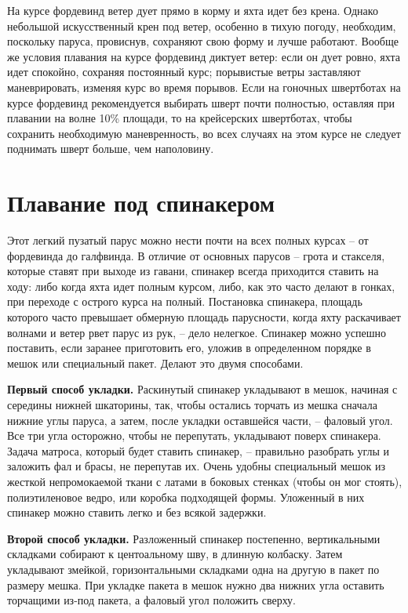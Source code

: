 \documentclass[a4paper, 12pt, twoside, final]{scrbook}
\begin{document}
На курсе фордевинд ветер дует прямо в корму и яхта идет без крена. Однако небольшой искусственный крен под ветер, особенно в тихую погоду, необходим, поскольку паруса, провиснув, сохраняют свою форму и лучше работают. Вообще же условия плавания на курсе фордевинд диктует ветер: если он дует ровно, яхта идет спокойно, сохраняя постоянный курс; порывистые ветры заставляют маневрировать, изменяя курс во время порывов.
Если на гоночных швертботах на курсе фордевинд рекомендуется выбирать шверт почти полностью, оставляя при плавании на волне 10\% площади, то на крейсерских швертботах, чтобы сохранить необходимую маневренность, во всех случаях на этом курсе не следует поднимать шверт больше, чем наполовину.

\section{Плавание под спинакером}

Этот легкий пузатый парус можно нести почти на всех полных курсах \--- от фордевинда до галфвинда. В отличие от основных парусов \--- грота и стакселя, которые ставят при выходе из гавани, спинакер всегда приходится ставить на ходу: либо когда яхта идет полным курсом, либо, как это часто делают в гонках, при переходе с острого курса на полный. Постановка спинакера, площадь которого часто превышает обмерную площадь парусности, когда яхту раскачивает волнами и ветер рвет парус из рук, \--- дело нелегкое. Спинакер можно успешно поставить, если заранее приготовить его, уложив в определенном порядке в мешок или специальный пакет. Делают это двумя способами.

\textbf{Первый способ укладки.} Раскинутый спинакер укладывают в мешок, начиная с середины нижней шкаторины, так, чтобы остались торчать из мешка сначала нижние углы паруса, а затем, после укладки оставшейся части, \--- фаловый угол. Все три угла осторожно, чтобы не перепутать, укладывают поверх спинакера. Задача матроса, который будет ставить спинакер, \--- правильно разобрать углы и заложить фал и брасы, не перепутав их. Очень удобны специальный мешок из жесткой непромокаемой ткани с латами в боковых стенках (чтобы он мог стоять), полиэтиленовое ведро, или коробка подходящей формы. Уложенный в них спинакер можно ставить легко и без всякой задержки.

\textbf{Второй способ укладки.} Разложенный спинакер постепенно, вертикальными складками собирают к центоальному шву, в длинную колбаску. Затем укладывают змейкой, горизонтальными складками одна на другую в пакет по размеру мешка. При укладке пакета в мешок нужно два нижних угла оставить торчащими из-под пакета, а фаловый угол положить сверху.
\end{document}
